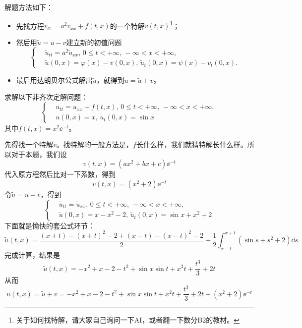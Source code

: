解题方法如下：
\begin{itemize}
    \item 先找方程$v_{tt} = a^2 v_{xx} + f(t, x)$的一个特解$v(t, x)$\footnote{关于如何找特解，请大家自己询问一下AI，或者翻一下数分B2的教材。}；
    \item 然后用$\tilde{u} = u - v$建立新的初值问题
        \begin{equation*}
            \left\{
                \begin{aligned}
                    &\tilde{u}_{tt} = a^2 \tilde{u}_{xx},\, 0 \leq t < +\infty,\, -\infty < x < +\infty,\\
                    &\tilde{u}(0, x) = \varphi(x) - v(0, x),\, \tilde{u}_t(0, x) = \psi(x) - v_t(0, x).
                \end{aligned}
            \right.
        \end{equation*}
    \item 最后用达朗贝尔公式解出$\tilde{u}$，就得到$u = \tilde{u} + v$。
\end{itemize}
\begin{problembox}
    \begin{example}\label{eg:1.5}
        求解以下非齐次定解问题：
        \begin{equation*}
            \left\{
                \begin{aligned}
                    &u_{tt} = u_{xx} + f(t, x),\, 0 \leq t < +\infty,\, -\infty < x < +\infty,\\
                    &u(0, x) = x,\, u_t(0, x) = \sin x
                \end{aligned}
            \right.
        \end{equation*}
        其中$f(t, x) = x^2 \ee^{-t}$。
    \end{example}
    \begin{solution}
        先得找一个特解$v$。找特解的一般方法是，$f$长什么样，我们就猜特解长什么样。所以对于本题，我们设
        \[v(t, x) = \left(a x^2 + b x + c\right)\ee^{-t}\]
        代入原方程然后比对一下系数，得到
        \[v(t, x) = \left(x^2 + 2\right) \ee^{-t}\]
        令$\tilde{u} = u - v$，得到
        \begin{equation*}
            \left\{
                \begin{aligned}
                    &\tilde{u}_{tt} = \tilde{u}_{xx},\, 0 \leq t < +\infty,\, -\infty < x < +\infty,\\
                    &\tilde{u}(0, x) = x - x^2 - 2,\, \tilde{u}_t(0, x) = \sin x + x^2 + 2
                \end{aligned}
            \right.
        \end{equation*}
        下面就是愉快的套公式环节：
        \[\tilde{u}(t, x) = \frac{\left(x + t\right) - \left(x + t\right)^2 - 2 + \left(x - t\right) - \left(x - t\right)^2 - 2}{2} + \frac{1}{2}\int_{x - t}^{x + t} \left(\sin s + s^2 + 2\right) \dd{s}\]
        完成计算，结果是
        \[\tilde{u}(t, x) = -x^2 + x - 2 - t^2 + \sin x \sin t + x^2 t + \frac{t^3}{3} + 2 t\]
        从而
        \[u(t, x) = \tilde{u} + v = -x^2 + x - 2 - t^2 + \sin x \sin t + x^2 t + \frac{t^3}{3} + 2 t + \left(x^2 + 2\right) \ee^{-t}\]
    \end{solution}
\end{problembox}
